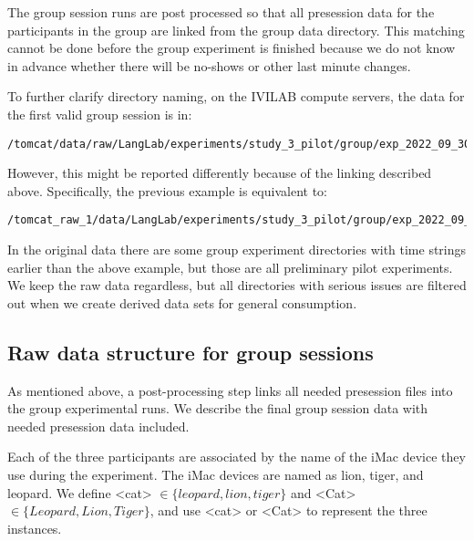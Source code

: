 The group session runs are post processed so that all presession data for the
participants in the group are linked from the group data directory. This
matching cannot be done before the group experiment is finished because we do
not know in advance whether there will be no-shows or other last minute
changes.

To further clarify directory naming, on the IVILAB compute servers,
the data for the first valid group session is in:
%
\begin{verbatim}
/tomcat/data/raw/LangLab/experiments/study_3_pilot/group/exp_2022_09_30_10
\end{verbatim}
However, this might be reported  differently because of the linking described
above. Specifically, the previous example is equivalent to:
%
\begin{verbatim}
/tomcat_raw_1/data/LangLab/experiments/study_3_pilot/group/exp_2022_09_30_10
\end{verbatim}
%
In the original data there are some group experiment directories with time
strings earlier than the above example, but those are all preliminary pilot
experiments. We keep the raw data regardless, but all directories with serious
issues are filtered out when we create derived data sets for general
consumption.

\subsection{Raw data structure for group sessions}

As mentioned above, a post-processing step links all needed presession files into
the group experimental runs. We describe the final group session data with
needed presession data included.


Each of the three participants are associated by the name of the iMac device
they use during the experiment.
The iMac devices are named as lion, tiger, and
leopard. We define
<cat> $\in \{leopard, lion, tiger\}$
and <Cat> $\in \{Leopard, Lion, Tiger\}$,
and use <cat> or <Cat> to represent the three instances.


